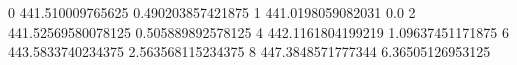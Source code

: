 0 441.510009765625 0.490203857421875
1 441.0198059082031 0.0
2 441.52569580078125 0.505889892578125
4 442.1161804199219 1.09637451171875
6 443.5833740234375 2.563568115234375
8 447.3848571777344 6.36505126953125
